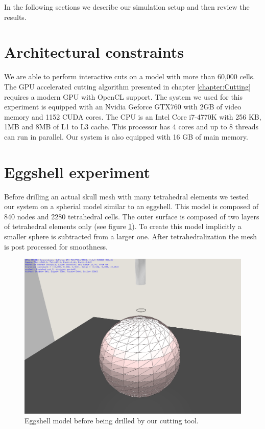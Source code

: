 In the following sections we describe our simulation setup and then review the results. 

\section{Architectural constraints}
We are able to perform interactive cuts on a model with more than 60,000 cells. The GPU accelerated cutting algorithm 
presented in chapter \ref{chapter:Cutting} requires a modern GPU with OpenCL support. The system we used for this
experiment is equipped with an Nvidia Geforce GTX760 with 2GB of video memory and 1152 CUDA cores. The CPU is an 
Intel Core i7-4770K with 256 KB, 1MB and 8MB of L1 to L3 cache. This processor has 4 cores and up to 8 threads can run in parallel. 
Our system is also equipped with 16 GB of main memory. 

\section{Eggshell experiment}
Before drilling an actual skull mesh with many tetrahedral elements we tested our system on a spherial model similar to 
an eggshell. This model is composed of 840 nodes and 2280 tetrahedral cells. The outer surface is composed of two layers 
of tetrahedral elements only (see figure \ref{fig:eggshell01}). To create this model implicitly a smaller sphere is subtracted 
from a larger one. After tetrahedralization the mesh is post processed for smoothness.

\begin{figure}[H]
  \centering
  \includegraphics[width=0.7\linewidth]{figures/evaluation/eggshell01.png}
  \caption{\label{fig:eggshell01}
  {Eggshell model before being drilled by our cutting tool.}
}
\end{figure}

